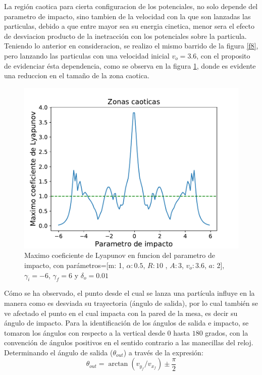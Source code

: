 \documentclass[11pt,letterpaper,twocolumn]{article}
\begin{document}
La región caotica para cierta configuracion de los potenciales, no solo depende del parametro de impacto, sino tambien de la velocidad con la que son lanzadas las particulas, debido a que entre mayor sea su energia cinetica, menor sera el efecto de desviacion producto de la inetracción con los potenciales sobre la particula. Teniendo lo anterior en consideracion, se realizo el mismo barrido de la figura \ref{f8}, pero lanzando las particulas con una velocidad inicial $v_{o}=3.6$, con el proposito de evidenciar ésta dependencia, como se observa en la figura \ref{caoss}, donde es evidente una reduccion en el tamaño de la zona caotica. 
\begin{figure}[h!]
\centering 
\includegraphics[scale=0.55]{g10.pdf}
\caption{Maximo coeficiente de Lyapunov en funcion del parametro de impacto, con parámetros=[m: 1, $\alpha: 0$.$5$, $R: 10$ , $A: 3$, $ v_{o}: $3.$6$, $a$: 2], $\gamma_{i}=-6$, $\gamma_{f}=6$ y $\delta_{o}=0.01$}
\label{caoss}
\end{figure}
\par 
Cómo se ha observado, el punto desde el cual se lanza una partícula influye en la manera como es desviada su trayectoria (ángulo de salida), por lo cual también se ve afectado el punto en el cual impacta con la pared de la mesa, es decir su ángulo de impacto. Para la identificación de los ángulos de salida e impacto, se tomaron los ángulos con respecto a la vertical desde $0$ hasta $180$ grados, con la convención de ángulos positivos en el sentido contrario a las manecillas del reloj. Determinando el ángulo de salida ($\theta_{out}$) a través de la expresión:
$$\theta_{out}=\arctan(v_{y_{f}}/v_{x_{f}}) \pm \dfrac{\pi}{2}$$
\end{document}
